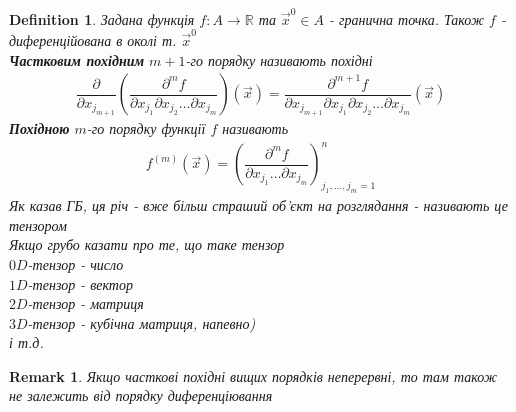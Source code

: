 \documentclass[a4paper, 14pt]{extarticle}
\theoremstyle{theoremdd}
\theoremstyle{theoremdd}
\newtheorem{definition}[theorem]{Definition}
\theoremstyle{theoremdd}
\theoremstyle{theoremdd}
\theoremstyle{theoremdd}
\theoremstyle{theoremdd}
\newtheorem{remark}[theorem]{Remark}
\theoremstyle{theoremdd}
\theoremstyle{theoremdd}
\begin{document}
\begin{definition}
Задана функція $f: A \to \mathbb{R}$ та $\vec{x}^0 \in A$ - гранична точка. Також $f$ - диференційована в околі т. $\vec{x}^0$\\
\textbf{Частковим похідним} $m+1$-го порядку називають похідні
\begin{align*}
\dfrac{\partial}{\partial x_{j_{m+1}}} \left( \dfrac{\partial^m f}{\partial x_{j_1} \partial x_{j_2} \dots \partial x_{j_m}} \right)(\vec{x}) = \dfrac{\partial^{m+1} f}{\partial x_{j_{m+1}} \partial x_{j_1} \partial x_{j_2} \dots \partial x_{j_m}}(\vec{x})
\end{align*}
\textbf{Похідною} $m$-го порядку функції $f$ називають
\begin{align*}
f^{(m)}(\vec{x}) = \left( \dfrac{\partial^m f}{\partial x_{j_1} \dots \partial x_{j_m}} \right)^n_{j_1,\dots,j_m=1}
\end{align*}
Як казав ГБ, ця річ - вже більш страший об'єкт на розглядання - називають це тензором\\
Якщо грубо казати про те, що таке тензор\\
$0D$-тензор - число\\
$1D$-тензор - вектор\\
$2D$-тензор - матриця\\
$3D$-тензор - кубічна матриця, напевно)\\
і т.д.
\end{definition}

\begin{remark}
Якщо часткові похідні вищих порядків неперервні, то там також не залежить від порядку диференціювання
\end{remark}
\end{document}
